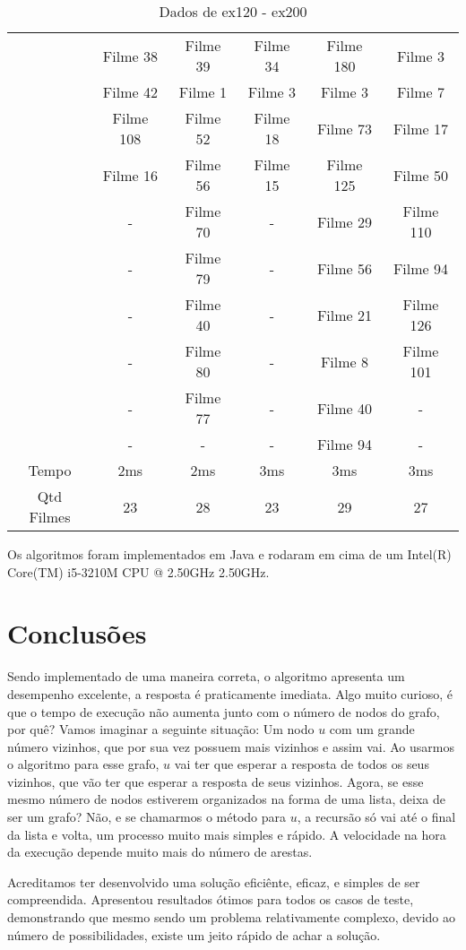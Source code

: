 \documentclass[12pt]{article}
\begin{document}
\begin{table}[H]
\begin{tabular}{|c|c|c|c|c|c|}
\cline{2-6}
& Filme 38 & Filme 39 & Filme 34 & Filme 180 & Filme 3 \\
\cline{2-6}
& Filme 42 & Filme 1 & Filme 3 & Filme 3 & Filme 7 \\
\cline{2-6}
& Filme 108 & Filme 52 & Filme 18 & Filme 73 & Filme 17 \\
\cline{2-6}
& Filme 16 & Filme 56 & Filme 15 & Filme 125 & Filme 50 \\
\cline{2-6}
& - & Filme 70 & - & Filme 29 & Filme 110 \\
\cline{2-6}
& - & Filme 79 & - & Filme 56 & Filme 94 \\
\cline{2-6}
& - & Filme 40 & - & Filme 21 & Filme 126 \\
\cline{2-6}
& - & Filme 80 & - & Filme 8 & Filme 101 \\
\cline{2-6}
& - & Filme 77 & - & Filme 40 & - \\
\cline{2-6}
& - & - & - & Filme 94 & - \\
\hline
Tempo & 2ms & 2ms & 3ms & 3ms & 3ms \\
\hline
Qtd Filmes & 23 & 28 & 23 & 29 & 27\\
\hline

\end{tabular}
\label{Tabela2}
\caption{Dados de ex120 - ex200}

\end{table}

Os algoritmos foram implementados em Java e rodaram em cima de um Intel(R) Core(TM) i5-3210M CPU @ 2.50GHz 2.50GHz.

\section{Conclusões}

Sendo implementado de uma maneira correta, o algoritmo apresenta um desempenho excelente, a resposta é praticamente imediata. Algo muito curioso, é que o tempo de execução não aumenta junto com o número de nodos do grafo, por quê? Vamos imaginar a seguinte situação: Um nodo $u$ com um grande número vizinhos, que por sua vez possuem mais vizinhos e assim vai. Ao usarmos o algoritmo para esse grafo, $u$ vai ter que esperar a resposta de todos os seus vizinhos, que vão ter que esperar a resposta de seus vizinhos. Agora, se esse mesmo número de nodos estiverem organizados na forma de uma lista, deixa de ser um grafo? Não, e se chamarmos o método para $u$, a recursão só vai até o final da lista e volta, um processo muito mais simples e rápido. A velocidade na hora da execução depende muito mais do número de arestas.

Acreditamos ter desenvolvido uma solução eficiênte, eficaz, e simples de ser compreendida. Apresentou resultados ótimos para todos os casos de teste, demonstrando que mesmo sendo um problema relativamente complexo, devido ao número de possibilidades, existe um jeito rápido de achar a solução.
\end{document}
